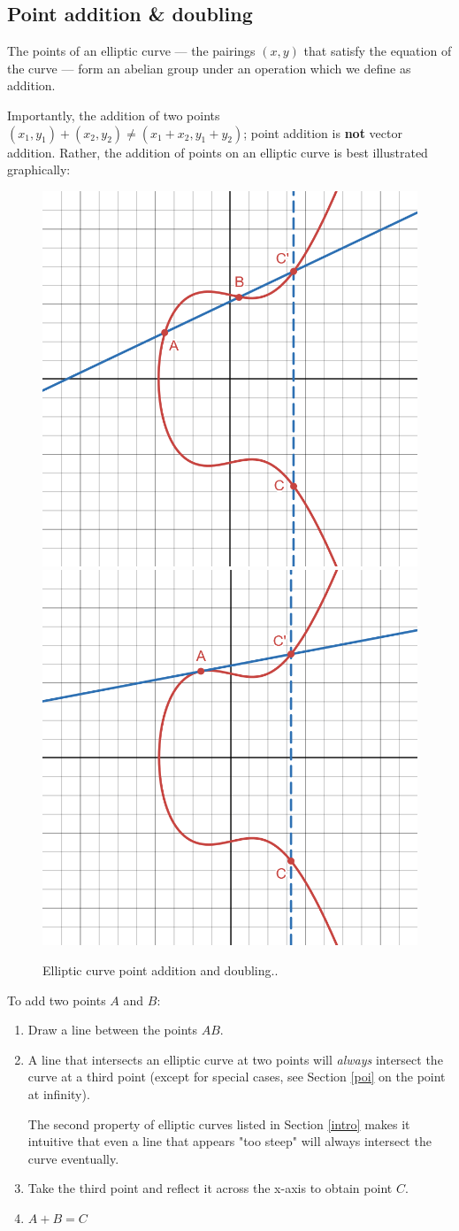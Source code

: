 \documentclass[a4paper]{article}
\begin{document}
\subsection{Point addition \& doubling}

The points of an elliptic curve --- the pairings $(x,y)$ that satisfy the equation of the curve --- form an abelian group under an operation which we define as addition. 

Importantly, the addition of two points $(x_1, y_1) + (x_2, y_2) \ne (x_1 + x_2, y_1 + y_2)$; point addition is \textbf{not} vector addition. Rather, the addition of points on an elliptic curve is best illustrated graphically:

\begin{figure}[h]
    \centering
    \includegraphics[width=0.3\linewidth]{images/add-add.png}
    \includegraphics[width=0.3\linewidth]{images/add-double.png}
    \caption{Elliptic curve point addition and doubling..}
    \label{fig:add}
\end{figure}

To add two points $A$ and $B$: 
\begin{enumerate}
    \item Draw a line between the points $AB$.
    \item A line that intersects an elliptic curve at two points will \textit{always} intersect the curve at a third point (except for special cases, see Section \ref{poi} on the point at infinity).
    
    The second property of elliptic curves listed in Section \ref{intro} makes it intuitive that even a line that appears "too steep" will always intersect the curve eventually.
    \item Take the third point and reflect it across the x-axis to obtain point $C$.
    \item $A + B = C$
\end{enumerate}
\end{document}
